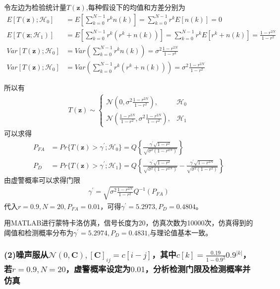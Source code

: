 \documentclass[fontset=windows]{article}
\numberwithin{figure}{section}
\begin{document}
令左边为检验统计量\(T(\mathbf{z})\),每种假设下的均值和方差分别为
\begin{align*}
	E[T(\mathbf{z});\mathcal{H}_0]   & =E\left[\sum_{k=0}^{N-1}r^kn(k)\right]=\sum_{k=0}^{N-1}r^kE[n(k)]=0                                \\
	E[T(\mathbf{z};\mathcal{H}_1)]   & =E\left[\sum_{k=0}^{N-1}r^k(r^k+n(k))\right]=\sum_{k=0}^{N-1}r^kE[r^k+n(k)]=\frac{1-r^{2N}}{1-r^2} \\
	Var[T(\mathbf{z});\mathcal{H}_0] & =Var\left(\sum_{k=0}^{N-1}r^kn(k)\right)=\sigma^2\frac{1-r^{2N}}{1-r^2}                            \\
	Var[T(\mathbf{z});\mathcal{H}_0] & =Var\left(\sum_{k=0}^{N-1}r^k(r^k+n(k))\right)=\sigma^2\frac{1-r^{2N}}{1-r^2}
\end{align*}

所以有
\begin{align*}
	T(\mathbf{z})\sim\left\{
	\begin{matrix}
		\mathcal{N}(0,\sigma^2\frac{1-r^{2N}}{1-r^2}),                      & \mathcal{H}_0 \\
		\mathcal{N}(\frac{1-r^{2N}}{1-r^2},\sigma^2\frac{1-r^{2N}}{1-r^2}), & \mathcal{H}_1
	\end{matrix}
	\right.
\end{align*}
可以求得
\begin{align*}
	P_{FA} & =Pr\{T(\mathbf{z})>\gamma^{\prime};\mathcal{H}_0\}=Q\left\{\frac{\gamma^{\prime}\sqrt{1-r^2}}{\sqrt{\sigma^2(1-r^{2N})}}\right\}                                                               \\
	P_D    & =Pr\{T(\mathbf{z})>\gamma^{\prime};\mathcal{H}_1\}=Q\left\{\frac{\gamma^{\prime}\sqrt{1-r^2}}{\sqrt{\sigma^2(1-r^{2N})}}-\frac{\gamma^{\prime}\sqrt{1-r^{2N}}}{\sqrt{\sigma^2(1-r^2)}}\right\}
\end{align*}
由虚警概率可以求得门限
\begin{align*}
	\gamma^{\prime}=\sqrt{\sigma^2\frac{1-r^{2N}}{1-r^2}}Q^{-1}(P_{FA})
\end{align*}
代入\(r=0.9,N=20,P_{FA}=0.01\)，可得\(\gamma^{\prime}=5.2973,P_D=0.4804\)。

用MATLAB进行蒙特卡洛仿真，信号长度为20，仿真次数为10000次，仿真得到的阈值和检测概率分布为\(\gamma^{\prime}=5.2974,P_D=0.4831\),与理论值基本一致。

\subsubsection*{(2)噪声服从\(\mathcal{N}(0,\mathbf{C}),[\mathbf{C}]_{ij}=c[i-j]\)，其中\(c[k]=\frac{0.19}{1-0.9^2}0.9^{|k|}\)，若\(r=0.9,N=20\)，虚警概率设定为\(0.01\)，分析检测门限及检测概率并仿真}
\end{document}
